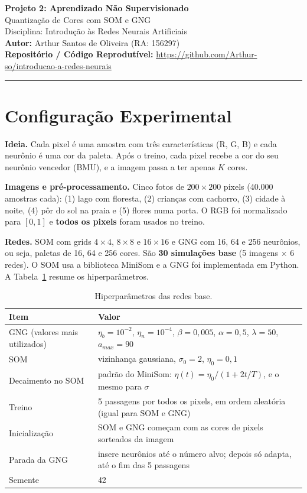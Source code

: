 \documentclass[11pt,a4paper]{article}
\begin{document}
\begin{center}
    {\LARGE \textbf{Projeto 2: Aprendizado Não Supervisionado}} \\[0.3em]
    {\large Quantização de Cores com SOM e GNG} \\[0.3em]
    {\large Disciplina: Introdução às Redes Neurais Artificiais} \\[0.3em]
    \textbf{Autor:} Arthur Santos de Oliveira (RA: 156297) \\[0.2em]
    \textbf{Repositório / Código Reprodutível:} \url{https://github.com/Arthur-so/introducao-a-redes-neurais}
\end{center}
\vspace{-0.5em}
\hrule
\vspace{0.8em}

\section{Configuração Experimental}

\textbf{Ideia.} Cada pixel é uma amostra com três características (R, G, B) e cada neurônio é uma cor da paleta. Após o treino, cada pixel recebe a cor do seu neurônio vencedor (BMU), e a imagem passa a ter apenas $K$ cores.

\textbf{Imagens e pré-processamento.} Cinco fotos de $200\times200$ pixels (40.000 amostras cada): (1) lago com floresta, (2) crianças com cachorro, (3) cidade à noite, (4) pôr do sol na praia e (5) flores numa porta. O RGB foi normalizado para $[0, 1]$ e \textbf{todos os pixels} foram usados no treino.

\textbf{Redes.} SOM com grids $4\times4$, $8\times8$ e $16\times16$ e GNG com 16, 64 e 256 neurônios, ou seja, paletas de 16, 64 e 256 cores. São \textbf{30 simulações base} (5 imagens $\times$ 6 redes). O SOM usa a biblioteca MiniSom e a GNG foi implementada em Python. A Tabela~\ref{tab:hiper} resume os hiperparâmetros.

\begin{table}[H]
\centering
\small
\caption{Hiperparâmetros das redes base.}
\label{tab:hiper}
\begin{tabularx}{\textwidth}{lX}
\toprule
\textbf{Item} & \textbf{Valor} \\
\midrule
GNG (valores mais utilizados) & $\eta_b = 10^{-2}$, $\eta_n = 10^{-4}$, $\beta = 0{,}005$, $\alpha = 0{,}5$, $\lambda = 50$, $a_{max} = 90$ \\
SOM & vizinhança gaussiana, $\sigma_0 = 2$, $\eta_0 = 0{,}1$ \\
Decaimento no SOM & padrão do MiniSom: $\eta(t) = \eta_0 / (1 + 2t/T)$, e o mesmo para $\sigma$ \\
Treino & 5 passagens por todos os pixels, em ordem aleatória (igual para SOM e GNG) \\
Inicialização & SOM e GNG começam com as cores de pixels sorteados da imagem \\
Parada da GNG & insere neurônios até o número alvo; depois só adapta, até o fim das 5 passagens \\
Semente & 42 \\
\bottomrule
\end{tabularx}
\end{table}
\end{document}
